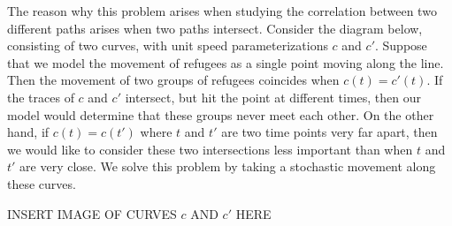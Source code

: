 \documentclass{article}
\begin{document}
The reason why this problem arises when studying the correlation between two different paths arises when two paths intersect. Consider the diagram below, consisting of two curves, with unit speed parameterizations $c$ and $c'$. Suppose that we model the movement of refugees as a single point moving along the line. Then the movement of two groups of refugees coincides when $c(t) = c'(t)$. If the traces of $c$ and $c'$ intersect, but hit the point at different times, then our model would determine that these groups never meet each other. On the other hand, if $c(t) = c(t')$ where $t$ and $t'$ are two time points very far apart, then we would like to consider these two intersections less important than when $t$ and $t'$ are very close. We solve this problem by taking a stochastic movement along these curves.

INSERT IMAGE OF CURVES $c$ AND $c'$ HERE
\end{document}
